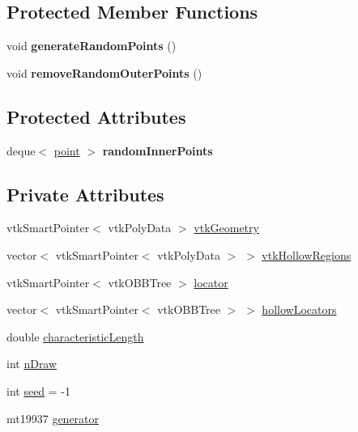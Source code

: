 \subsection*{Protected Member Functions}
\begin{DoxyCompactItemize}
\item 
void {\bfseries generate\+Random\+Points} ()\hypertarget{class_domain_n_v_r_a7bcd43488a6810609d6004653d36566f}{}\label{class_domain_n_v_r_a7bcd43488a6810609d6004653d36566f}

\item 
void {\bfseries remove\+Random\+Outer\+Points} ()\hypertarget{class_domain_n_v_r_aae7ebe5baaefe6824097127c8d91bb2c}{}\label{class_domain_n_v_r_aae7ebe5baaefe6824097127c8d91bb2c}

\end{DoxyCompactItemize}
\subsection*{Protected Attributes}
\begin{DoxyCompactItemize}
\item 
deque$<$ \hyperlink{structpoint}{point} $>$ {\bfseries random\+Inner\+Points}\hypertarget{class_domain_n_v_r_a8fbb161c35df4d674c42fcf0baa76284}{}\label{class_domain_n_v_r_a8fbb161c35df4d674c42fcf0baa76284}

\end{DoxyCompactItemize}
\subsection*{Private Attributes}
\begin{DoxyCompactItemize}
\item 
vtk\+Smart\+Pointer$<$ vtk\+Poly\+Data $>$ \hyperlink{class_domain_n_v_r_a4870df18eb5b742c6a76ad9ba04533a2}{vtk\+Geometry}
\item 
vector$<$ vtk\+Smart\+Pointer$<$ vtk\+Poly\+Data $>$ $>$ \hyperlink{class_domain_n_v_r_aff487471a8d4fc7b0a5cfeeb119f8471}{vtk\+Hollow\+Regions}
\item 
vtk\+Smart\+Pointer$<$ vtk\+O\+B\+B\+Tree $>$ \hyperlink{class_domain_n_v_r_a3352f4af5dcc9c78cf2a56fd720da497}{locator}
\item 
vector$<$ vtk\+Smart\+Pointer$<$ vtk\+O\+B\+B\+Tree $>$ $>$ \hyperlink{class_domain_n_v_r_a8848ec8d5e22bb9d03bd946087f0fa00}{hollow\+Locators}
\item 
double \hyperlink{class_domain_n_v_r_a7806401ba6d4de5d8e39d0f468f23ff2}{characteristic\+Length}
\item 
int \hyperlink{class_domain_n_v_r_aa8a3d85f1a554c27e0ca399924576822}{n\+Draw}
\item 
int \hyperlink{class_domain_n_v_r_aaf470f5f729cb3fc68d5449c52eccde5}{seed} = -\/1
\item 
mt19937 \hyperlink{class_domain_n_v_r_a0b5be1fa94ce69a9af453274122b8387}{generator}
\end{DoxyCompactItemize}


